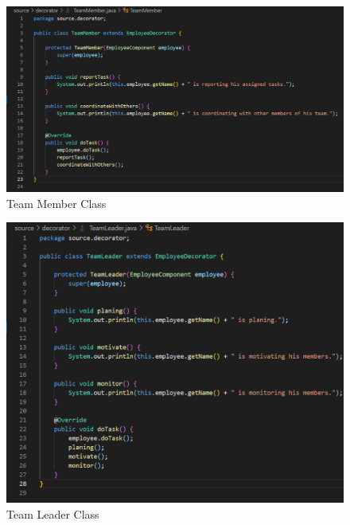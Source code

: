\begin{figure}[!htb]
    \centering
    \includegraphics[width=\textwidth]{fig/Decorator/team_member_class.png}
    \caption{Team Member Class}
    \label{fig:team_member_class}
\end{figure}
\begin{figure}[!htb]
    \centering
    \includegraphics[width=\textwidth]{fig/Decorator/team_leader_class.png}
    \caption{Team Leader Class}
    \label{fig:team_leader_class}
\end{figure}
\newpage
